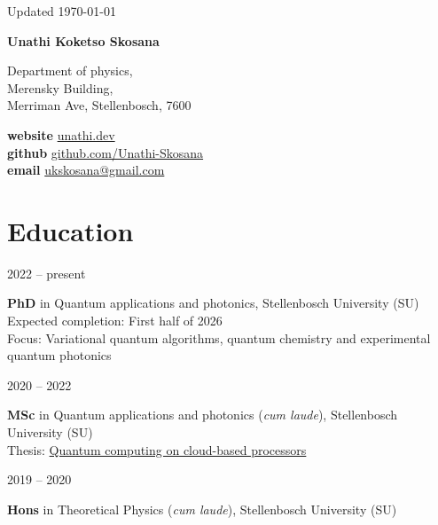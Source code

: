 \documentclass[9pt]{extreport}
\newcommand*{\name}{Unathi Koketso Skosana}
\newcommand{\namefont}[1]{{\normalfont\bfseries\Huge{#1}}}
\newcommand{\entry}[2]{%
  \noindent%
  \begin{minipage}[t]{2.25cm}%
    \raggedright #1%
  \end{minipage}%
  \hspace{0.4cm}%
  \begin{minipage}[t]{\dimexpr\textwidth-2cm\relax}%
    #2%
  \end{minipage}%
  \vspace{0.25cm}%
}
\begin{document}
\begin{center}
	\vfill
	\small {Updated \monthyeardate\today}
\end{center}

\vspace{2em}

\namefont{\name}

\vspace{1em}

\begin{minipage}[t]{0.45\linewidth}
   Department of physics, \vspace*{0.2cm}\\
   Merensky Building, \vspace*{0.2cm} \\
   Merriman Ave, Stellenbosch, 7600
\end{minipage}
\hfill
\begin{minipage}[t]{0.5\linewidth}
	\textbf{website} \href{https://www.unathi.dev}{unathi.dev} \vspace*{0.2cm} \\
	\textbf{github}  \href{https://www.github.com/Unathi-Skosana}{github.com/Unathi-Skosana} \vspace*{0.2cm} \\
	\textbf{email}   \href{mailto:ukskosana@gmail.com}{ukskosana@gmail.com} \hfill
\end{minipage}

\section*{Education}

\entry{2022 -- present}{\textbf{PhD} in Quantum applications and photonics, Stellenbosch University (SU) \\
{Expected completion}: First half of 2026 \\
{Focus}: Variational quantum algorithms, quantum chemistry and experimental quantum photonics}

\entry{2020 -- 2022}{\textbf{MSc} in Quantum applications and photonics (\textit{cum laude}), Stellenbosch University (SU) \\
  {Thesis}: \href{https://github.com/Unathi-Skosana/mastersthesis}{Quantum computing on cloud-based processors}}

\entry{2019 -- 2020}{\textbf{Hons} in Theoretical Physics (\textit{cum laude}), Stellenbosch University (SU)}
\end{document}
